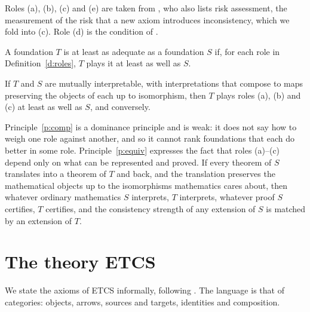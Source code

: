 \documentclass{situationist-preprint}
\begin{document}
Roles (a), (b), (c) and (e) are taken from \citet{Maddy2017}, who also lists risk assessment, the measurement of the risk that a new axiom introduces inconsistency, which we fold into (c). Role (d) is the condition of \citet{LinneboPettigrew2011}.

\begin{principle}\label{p:comp}
A foundation $T$ is at least as adequate as a foundation $S$ if, for each role in Definition~\ref{d:roles}, $T$ plays it at least as well as $S$.
\end{principle}

\begin{principle}\label{p:equiv}
If $T$ and $S$ are mutually interpretable, with interpretations that compose to maps preserving the objects of each up to isomorphism, then $T$ plays roles (a), (b) and (c) at least as well as $S$, and conversely.
\end{principle}

Principle~\ref{p:comp} is a dominance principle and is weak: it does not say how to weigh one role against another, and so it cannot rank foundations that each do better in some role. Principle~\ref{p:equiv} expresses the fact that roles (a)--(c) depend only on what can be represented and proved. If every theorem of $S$ translates into a theorem of $T$ and back, and the translation preserves the mathematical objects up to the isomorphisms mathematics cares about, then whatever ordinary mathematics $S$ interprets, $T$ interprets, whatever proof $S$ certifies, $T$ certifies, and the consistency strength of any extension of $S$ is matched by an extension of $T$.

\section{The theory ETCS}\label{s:etcs}

We state the axioms of ETCS informally, following \citet{Leinster2014}. The language is that of categories: objects, arrows, sources and targets, identities and composition.
\end{document}
